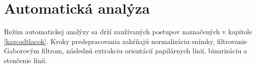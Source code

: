   \section{Automatická analýza}
  Režim automatickej analýzy sa drží zaužívaných postupov naznačených v kapitole \ref{kap:odtlacok}. Kroky predspracovania zahŕňajú 
  normalizáciu snímky, filtrovanie Gaborovým filtrom, následnú extrakciu orientácií papilárnych línií, binarizáciu a stenčenie línií.
  

